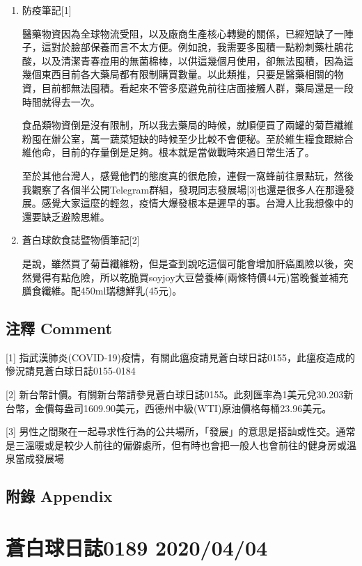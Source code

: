 \documentclass[
]{article}
\begin{document}
\begin{enumerate}
\def\labelenumi{\arabic{enumi}.}
\item
  防疫筆記{[}1{]}

  醫藥物資因為全球物流受阻，以及廠商生產核心轉變的關係，已經短缺了一陣子，這對於臉部保養而言不太方便。例如說，我需要多囤積一點粉刺藥杜鵑花酸，以及清潔青春痘用的無菌棉棒，以供這幾個月使用，卻無法囤積，因為這幾個東西目前各大藥局都有限制購買數量。以此類推，只要是醫藥相關的物資，目前都無法囤積。看起來不管多麼避免前往店面接觸人群，藥局還是一段時間就得去一次。

  食品類物資倒是沒有限制，所以我去藥局的時候，就順便買了兩罐的菊苣纖維粉囤在辦公室，萬一蔬菜短缺的時候至少比較不會便秘。至於維生糧食跟綜合維他命，目前的存量倒是足夠。根本就是當做戰時來過日常生活了。

  至於其他台灣人，感覺他們的態度真的很危險，連假一窩蜂前往景點玩，然後我觀察了各個半公開Telegram群組，發現同志發展場{[}3{]}也還是很多人在那邊發展。感覺大家這麼的輕忽，疫情大爆發根本是遲早的事。台灣人比我想像中的還要缺乏避險思維。
\item
  蒼白球飲食誌暨物價筆記{[}2{]}

  是說，雖然買了菊苣纖維粉，但是查到說吃這個可能會增加肝癌風險以後，突然覺得有點危險，所以乾脆買soyjoy大豆營養棒(兩條特價44元)當晚餐並補充膳食纖維。配450ml瑞穗鮮乳(45元)。
\end{enumerate}

\hypertarget{ux6ce8ux91cb-comment-2}{%
\subsection{注釋 Comment}\label{ux6ce8ux91cb-comment-2}}

{[}1{]}
指武漢肺炎(COVID-19)疫情，有關此瘟疫請見蒼白球日誌0155，此瘟疫造成的慘況請見蒼白球日誌0155-0184

{[}2{]}
新台幣計價。有關新台幣請參見蒼白球日誌0155。此刻匯率為1美元兌30.203新台幣，金價每盎司1609.90美元，西德州中級(WTI)原油價格每桶23.96美元。

{[}3{]}
男性之間聚在一起尋求性行為的公共場所，「發展」的意思是搭訕或性交。通常是三溫暖或是較少人前往的偏僻處所，但有時也會把一般人也會前往的健身房或溫泉當成發展場

\hypertarget{ux9644ux9304-appendix-2}{%
\subsection{附錄 Appendix}\label{ux9644ux9304-appendix-2}}

\hypertarget{ux84bcux767dux7403ux65e5ux8a8c0189-20200404}{%
\section{蒼白球日誌0189
2020/04/04}\label{ux84bcux767dux7403ux65e5ux8a8c0189-20200404}}
\end{document}
